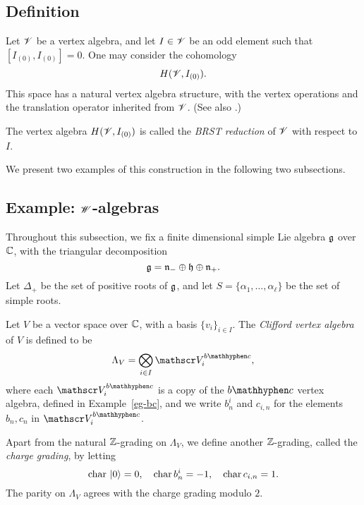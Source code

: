 \subsection{Definition}

Let $\mathscr{V}$ be a vertex algebra,
and let $I \in \mathscr{V}$ be an odd element such that $[I_{(0)}, I_{(0)}] = 0$.
One may consider the cohomology
\[
    H (\mathscr{V}, I_{(0)}).
\]
This space has a natural vertex algebra structure,
with the vertex operations and the translation operator
inherited from $\mathscr{V}$.
(See also \cite[\S5.7.3]{frenkel-ben-zvi}.)

\begin{definition}
    \label{def-brst-reduction}
    The vertex algebra $H (\mathscr{V}, I_{(0)})$
    is called the \emph{BRST reduction}
    of $\mathscr{V}$ with respect to $I$. \varqed
\end{definition}

We present two examples of this construction
in the following two subsections.


\subsection{Example: \texorpdfstring{$\mathscr{W}$}{W}-algebras}

Throughout this subsection,
we fix a finite dimensional simple Lie algebra $\mathfrak{g}$ over $\mathbb{C}$,
with the triangular decomposition
\[
    \mathfrak{g} = \mathfrak{n}_- \oplus \mathfrak{h} \oplus \mathfrak{n}_+ .
\]
Let $\Delta_+$ be the set of positive roots of $\mathfrak{g}$,
and let $S = \{ \alpha_1, \dotsc, \alpha_{\ell} \}$
be the set of simple roots.

\begin{definition}
    Let $V$ be a vector space over $\mathbb{C}$,
    with a basis $\{ v_i \}_{i \in I}$.
    The \emph{Clifford vertex algebra} of $V$ is defined to be
    \[
        \Lambda_V = \bigotimes_{i \in I} \scrV^{\bc}_i,
    \]
    where each $\scrV^{\bc}_i$
    is a copy of the $\bc$ vertex algebra,
    defined in Example~\ref{eg-bc},
    and we write $b^i_n$ and $c_{i, n}$
    for the elements $b_n, c_n$ in $\scrV^{\bc}_i$.
    
    Apart from the natural $\mathbb{Z}$-grading on $\Lambda_V$,
    we define another $\mathbb{Z}$-grading, called the \emph{charge grading},
    by letting
    \[
        \operatorname{char} {}\mathinner{\mathopen{|}0\mathclose{\rangle}} = 0, \quad
        \operatorname{char} b^i_{n} = -1, \quad
        \operatorname{char} c_{i, n} = 1.
    \]
    The parity on $\Lambda_V$ agrees with the charge grading modulo $2$.
    \varqed
\end{definition}

